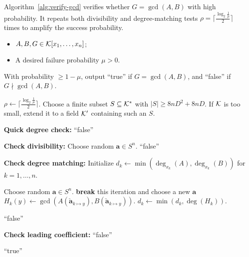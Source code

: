 \documentclass{article}
\numberwithin{equation}{section}
\begin{document}
Algorithm~\ref{alg:verify-gcd} verifies whether $G = \gcd(A, B)$ with high probability. It repeats both divisibility and degree-matching tests $\rho = \lceil \frac{\log_2\frac{1}{\mu}}{2} \rceil$ times to amplify the success probability.

\begin{algorithm}
\caption{Probabilistic GCD Verification over a Field}
\label{alg:verify-gcd}
\begin{algorithmic}[1]
\Require
    \begin{itemize}
        \item $A, B, G \in {\mathcal{K}}[x_1,\dots,x_n]$;
        \item A desired failure probability $\mu > 0$.
    \end{itemize}
\Ensure
    With probability $\ge 1-\mu$, output ``true'' if $G = \gcd(A,B)$, and ``false'' if $G \nmid \gcd(A,B)$.

\State $\rho \gets \lceil \frac{\log_2\frac{1}{\mu}}{2} \rceil$.
\State Choose a finite subset $S \subseteq {\mathcal{K}}^*$ with $|S| \ge 8nD^2 + 8nD$. If ${\mathcal{K}}$ is too small, extend it to a field ${\mathcal{K}}'$ containing such an $S$.

 \textbf{Quick degree check:}
        \State \Return ``false''
    \EndIf
\EndFor

\textbf{Check divisibility:}
    \State Choose random $\mathbf{a} \in S^n$.
                \State \Return ``false''
            \EndIf
        \EndFor
    \EndFor
\EndFor

\textbf{Check degree matching:}
\State Initialize $d_k \gets \min(\deg_{x_k}(A), \deg_{x_k}(B))$ for $k = 1,\dots,n$.

    \State Choose random $\mathbf{a} \in S^n$.
            \State \textbf{break} this iteration and choose a new $\mathbf{a}$
        \EndIf
        \State $H_k(y) \gets \gcd(A(\mathbf{\check{a}}_{k \mapsto y} ), B(\mathbf{\check{a}}_{k \mapsto y} ))$.
        \State $d_k \gets \min(d_k, \deg(H_k))$.
    \EndFor
\EndFor

        \State \Return ``false''
    \EndIf
\EndFor

\textbf{Check leading coefficient:}
    \State \Return ``false''
\EndIf

\State \Return ``true''
\end{algorithmic}
\end{algorithm}
\end{document}
